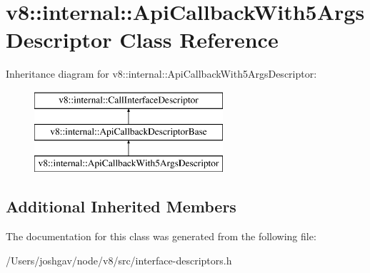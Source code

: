 \hypertarget{classv8_1_1internal_1_1_api_callback_with5_args_descriptor}{}\section{v8\+:\+:internal\+:\+:Api\+Callback\+With5\+Args\+Descriptor Class Reference}
\label{classv8_1_1internal_1_1_api_callback_with5_args_descriptor}
Inheritance diagram for v8\+:\+:internal\+:\+:Api\+Callback\+With5\+Args\+Descriptor\+:\begin{figure}[H]
\begin{center}
\leavevmode
\includegraphics[height=3.000000cm]{classv8_1_1internal_1_1_api_callback_with5_args_descriptor}
\end{center}
\end{figure}
\subsection*{Additional Inherited Members}


The documentation for this class was generated from the following file\+:\begin{DoxyCompactItemize}
\item 
/\+Users/joshgav/node/v8/src/interface-\/descriptors.\+h\end{DoxyCompactItemize}
